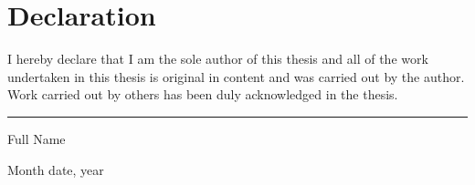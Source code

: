 \chapter*{Declaration}
\thispagestyle{empty}

I hereby declare that I am the sole author of this thesis and all of the work undertaken in this thesis is original in content and was carried out by the author. Work carried out by others has been duly acknowledged in the thesis.

\vspace{20mm}  %

\hspace{80mm}\rule{45mm}{.15mm}\par   %
\hspace{80mm} Full Name\par
\hspace{80mm} Month date, year
